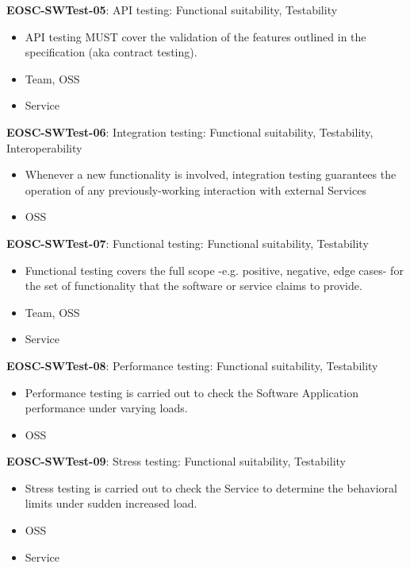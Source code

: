 \textbf{EOSC-SWTest-05}: API testing: Functional suitability, Testability

\begin{itemize}
    \item API testing MUST cover the validation of the features outlined in the specification (aka contract testing). \cite{orviz_fernandez_eosc-synergy_2020}
    \item Team, OSS
    \item Service
\end{itemize}

\textbf{EOSC-SWTest-06}: Integration testing: Functional suitability, Testability, Interoperability

\begin{itemize}
    \item Whenever a new functionality is involved, integration testing guarantees the operation of any previously-working interaction with external Services \cite{iso_25010_2011_2017,orviz_fernandez_eosc-synergy_2020}
    \item OSS
\end{itemize}

\textbf{EOSC-SWTest-07}: Functional testing: Functional suitability, Testability

\begin{itemize}
    \item Functional testing covers the full scope -e.g. positive, negative, edge cases- for the set of functionality that the software or service claims to provide. \cite{iso_25010_2011_2017,orviz_fernandez_eosc-synergy_2020}
    \item Team, OSS
    \item Service
\end{itemize}

\textbf{EOSC-SWTest-08}: Performance testing: Functional suitability, Testability

\begin{itemize}
    \item Performance testing is carried out to check the Software Application performance under varying loads. \cite{iso_25010_2011_2017,orviz_fernandez_eosc-synergy_2020}
    \item OSS
\end{itemize}

\textbf{EOSC-SWTest-09}: Stress testing: Functional suitability, Testability

\begin{itemize}
    \item Stress testing is carried out to check the Service to determine the behavioral limits under sudden increased load. \cite{orviz_fernandez_eosc-synergy_2020}
    \item OSS
    \item Service
\end{itemize}

